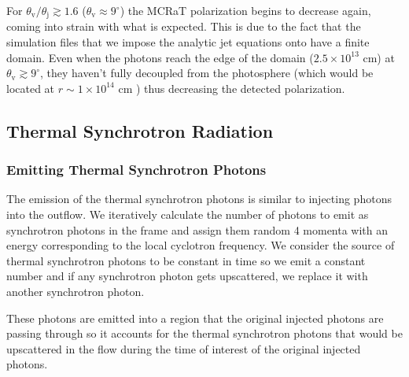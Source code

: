 \documentclass[12pt,a4paper]{article}
\begin{document}
For $\theta_{\mathrm{v}}/\theta_{\mathrm{j}} \gtrsim 1.6$ ($\theta_{\mathrm{v}} \approx 9^\circ$) the MCRaT polarization begins to decrease again, coming into strain with what is expected. This is due to the fact that the simulation files that we impose the analytic jet equations onto have a finite domain. Even when the photons reach the edge of the domain ($2.5 \times 10^{13}$ cm) at $\theta_{\mathrm{v}} \gtrsim 9^\circ$, they haven't fully decoupled from the photosphere (which would be located at $r\sim 1\times 10^{14}$ cm \citep{lundman2014polarization}) thus decreasing the detected polarization. 

\subsection{Thermal Synchrotron Radiation}\label{synch}
\subsubsection{Emitting Thermal Synchrotron Photons}
The emission of the thermal synchrotron photons is similar to injecting photons into the outflow. We iteratively calculate the number of photons to emit as synchrotron photons in the frame and assign them random 4 momenta with an energy corresponding to the local cyclotron frequency. We consider the source of thermal synchrotron photons to be constant in time so we emit a constant number and if any synchrotron photon gets upscattered, we replace it with another synchrotron photon. 

These photons are emitted into a region that the original injected photons are passing through so it accounts for the thermal synchrotron photons that would be upscattered in the flow during the time of interest of the original injected photons.
\end{document}
